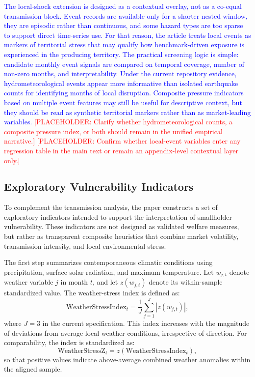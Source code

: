 \documentclass[11pt]{article}
\newcommand{\vTwo}[1]{\textcolor{blue}{#1}}
\newcommand{\placeholder}[1]{\textcolor{red}{[PLACEHOLDER: #1]}}
\begin{document}
\vTwo{The local-shock extension is designed as a contextual overlay, not as a co-equal transmission block. Event records are available only for a shorter nested window, they are episodic rather than continuous, and some hazard types are too sparse to support direct time-series use. For that reason, the article treats local events as markers of territorial stress that may qualify how benchmark-driven exposure is experienced in the producing territory.} \vTwo{The practical screening logic is simple: candidate monthly event signals are compared on temporal coverage, number of non-zero months, and interpretability. Under the current repository evidence, hydrometeorological events appear more informative than isolated earthquake counts for identifying months of local disruption. Composite pressure indicators based on multiple event features may still be useful for descriptive context, but they should be read as synthetic territorial markers rather than as market-leading variables.} \placeholder{Clarify whether hydrometeorological counts, a composite pressure index, or both should remain in the unified empirical narrative.} \placeholder{Confirm whether local-event variables enter any regression table in the main text or remain an appendix-level contextual layer only.}

\subsection{Exploratory Vulnerability Indicators}

To complement the transmission analysis, the paper constructs a set of exploratory indicators intended to support the interpretation of smallholder vulnerability. These indicators are not designed as validated welfare measures, but rather as transparent composite heuristics that combine market volatility, transmission intensity, and local environmental stress.

The first step summarizes contemporaneous climatic conditions using precipitation, surface solar radiation, and maximum temperature. Let $w_{j,t}$ denote weather variable $j$ in month $t$, and let $z(w_{j,t})$ denote its within-sample standardized value. The weather-stress index is defined as:
\begin{equation}
\mathrm{WeatherStressIndex}_t = \frac{1}{J} \sum_{j=1}^{J} \left| z(w_{j,t}) \right|,
\label{eq:weather_stress_index}
\end{equation}
where $J=3$ in the current specification. This index increases with the magnitude of deviations from average local weather conditions, irrespective of direction. For comparability, the index is standardized as:
\begin{equation}
\mathrm{WeatherStressZ}_t = z(\mathrm{WeatherStressIndex}_t),
\label{eq:weather_stress_z}
\end{equation}
so that positive values indicate above-average combined weather anomalies within the aligned sample.
\end{document}
